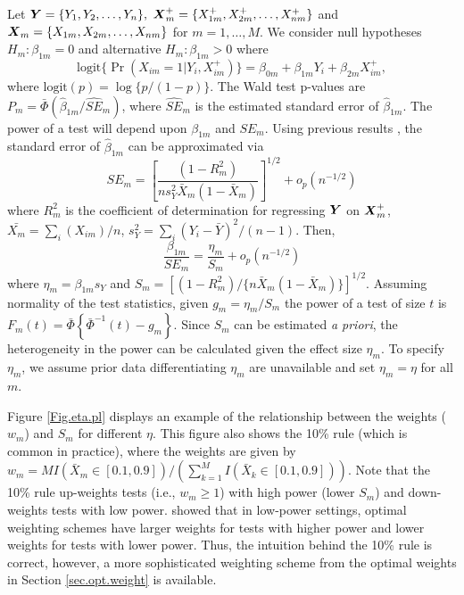 \documentclass[bimj,fleqn]{w-art}
\newcommand{\Y}{{\mbox{\boldmath $Y$}}}
\newcommand{\X}{{\mbox{\boldmath $X$}}}
\newcommand{\mbf}[1]{\mbox{\boldmath${#1}$}}
\theoremstyle{plain}
\theoremstyle{definition}
\begin{document}
Let $\mbf{Y}=\{Y_{1},Y_{2},\ldots,Y_{n}\},$ $\mbf{X}_m^+=\{X^+_{1m}, X^+_{2m}, \ldots, X^+_{nm}\}$ and $\mbf{X}_m=\{X_{1m},X_{2m},\ldots,X_{nm}\}$ for $m=1,\ldots,M$.   We consider null hypotheses $H_m:\beta_{1m}=0$ and alternative $H_m:\beta_{1m}>0$ where
%
$$\mbox{logit}\{\Pr(X_{im}=1|Y_i,X_{im}^+)\} = \beta_{0m} + \beta_{1m}Y_i + \beta_{2m} X^+_{im},$$
%
where $\mbox{logit}(p)=\log\{p/(1-p)\}$.  The Wald test p-values are $P_{m} = \bar\Phi(\hat \beta_{1m}/\widehat{SE}_m)$, where $\widehat{SE}_m$ is the estimated standard error of $\hat\beta_{1m}$. The power of a test will depend upon $\beta_{1m}$ and $SE_m$.  Using previous results \cite{VaeSko04}, the standard error of $\hat\beta_{1m}$  can be approximated via
%
\begin{equation}\label{eq.logreg.SE}
SE_m = \left[\frac{(1-R^2_{m})}{n s^2_Y\bar X_m(1-\bar X_m)} \right]^{1/2} + o_p(n^{-1/2})
\end{equation}
%
where $R^2_{m}$ is the coefficient of determination for regressing $\Y$ on $\X_m^+$, $\bar{X_m}=\sum_i(X_{im})/n$, $s_Y^2=\sum_i(Y_{i}-\bar Y)^2/(n-1)$. Then,
%
\begin{equation}\label{eq.logreg.T}
\frac{\beta_{1m}}{SE_m} = \frac{\eta_{m}}{S_{m}} +o_p(n^{-1/2})
\end{equation}
%
where $\eta_{m} = \beta_{1m}s_Y$  and $S_{m}=[(1-R^2_{m})/\{n\bar X_m(1-\bar X_m)\}]^{1/2}$.  Assuming normality of the test statistics, given $g_m = \eta_{m}/{S}_{m}$ the power of a test of size $t$ is $F_m(t) = \bar{\Phi}\left\{\bar{\Phi}^{-1}(t) - g_m\right\}$.  Since $S_m$ can be estimated \textit{a priori}, the heterogeneity in the power can be calculated given the effect size $\eta_m$. To specify $\eta_m$, we assume prior data differentiating $\eta_m$ are unavailable and set $\eta_m=\eta$ for all $m$.  



Figure \ref{Fig.eta.pl} displays an example of the relationship between the weights ($w_m$) and $S_m$ for different $\eta$. This figure also shows the 10\% rule (which is common in practice), where the weights are given by $w_m = MI(\bar X_m \in [0.1,0.9])/(\sum_{k=1}^M I(\bar X_k \in [0.1,0.9]))$. Note that the 10\% rule up-weights tests (i.e., $w_m \geq 1$) with high power (lower $S_m$) and down-weights tests with low power.  \cite{Habiger2017} showed that in low-power settings, optimal weighting schemes have larger weights for tests with higher power and lower weights for tests with lower power. Thus, the intuition behind the 10\% rule is correct, however, a more sophisticated weighting scheme from the optimal weights in Section \ref{sec.opt.weight} is available. 
\end{document}
